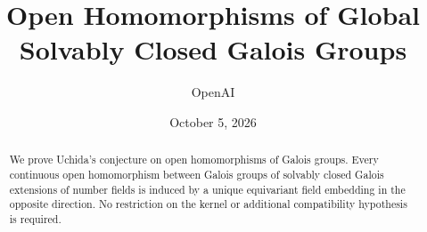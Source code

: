 \documentclass[11pt]{article}
\title{Open Homomorphisms of Global Solvably Closed Galois Groups}
\author{OpenAI}
\date{October 5, 2026}
\theoremstyle{definition}
\theoremstyle{remark}
\numberwithin{equation}{section}
\begin{document}
\maketitle
\begin{abstract}
We prove Uchida's conjecture on open homomorphisms of Galois groups. Every continuous open homomorphism between Galois groups of solvably closed Galois extensions of number fields is induced by a unique equivariant field embedding in the opposite direction. No restriction on the kernel or additional compatibility hypothesis is required.
\end{abstract}







\end{document}
